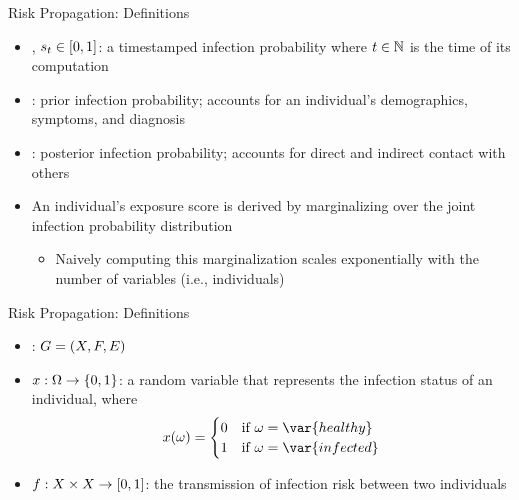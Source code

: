 \documentclass[11pt]{beamer}
\begin{document}
\begin{frame}{Risk Propagation: Definitions}
\begin{itemize}
  \item {}, $s_t \in [0, 1]$: a timestamped infection probability where $t \in \mathbb{N}$ is the time of its computation
  \item {}: prior infection probability; accounts for an individual's demographics, symptoms, and diagnosis \citep{Briers2020, Menni2020}
  \item {}: posterior infection probability; accounts for direct and indirect contact with others
  \item An individual's exposure score is derived by marginalizing over the joint infection probability distribution
    \begin{itemize}
      \item Naively computing this marginalization scales exponentially with the number of variables (i.e., individuals)
    \end{itemize}
\end{itemize}
\end{frame}

\begin{frame}{Risk Propagation: Definitions}
\begin{itemize}
  \item {}: $G = (X, F, E)$
  \item {} $\vVariable: \eventSpace \rightarrow \{0, 1\} $: a random variable that represents the infection status of an individual, where
    \begin{equation*}
      \vVariable(\event) =
        \begin{cases}
          0 & \text{if } \event = \var{healthy} \\
          1 & \text{if } \event = \var{infected}
        \end{cases}
    \end{equation*}
    \item {} $\vFactor: \vVariables \times \vVariables \rightarrow [0, 1]$: the transmission of infection risk between two individuals
\end{itemize}

\begin{figure}
\centering
{}
\end{figure}
\end{frame}
\end{document}

